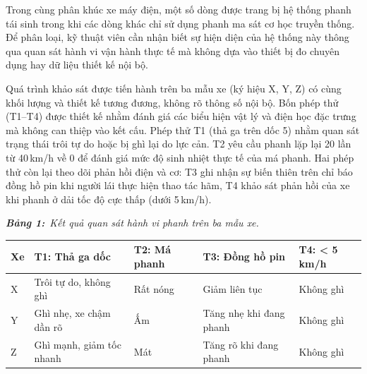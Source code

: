 \documentclass[12pt,a4paper,twoside]{article}
\newcommand{\tablecaption}[2]{%
    \par\vspace{2pt}%
    {\centering\textbf{\textit{Bảng #1:}}~\textit{#2}\par}%
    \vspace{0pt}%
}
\newenvironment{readingpassage}[1][]{%
    \begin{tcolorbox}[enhanced, colback=grayLight, colframe=secondaryBlue,
        coltitle=textDark, fonttitle=\bfseries, title={#1},
        rounded corners, arc=3mm, boxrule=1pt,
        left=15pt, right=15pt, top=10pt, bottom=10pt,
        breakable, before skip=10pt, after skip=10pt, drop fuzzy shadow]
    \setstretch{1.3}
}{\end{tcolorbox}}
\begin{document}
\begin{readingpassage}[]

Trong cùng phân khúc xe máy điện, một số dòng được trang bị hệ thống phanh tái sinh trong khi các dòng khác chỉ sử dụng phanh ma sát cơ học truyền thống. Để phân loại, kỹ thuật viên cần nhận biết sự hiện diện của hệ thống này thông qua quan sát hành vi vận hành thực tế mà không dựa vào thiết bị đo chuyên dụng hay dữ liệu thiết kế nội bộ.

Quá trình khảo sát được tiến hành trên ba mẫu xe (ký hiệu X, Y, Z) có cùng khối lượng và thiết kế tương đương, không rõ thông số nội bộ. Bốn phép thử (T1--T4) được thiết kế nhằm đánh giá các biểu hiện vật lý và điện học đặc trưng mà không can thiệp vào kết cấu. Phép thử T1 (thả ga trên dốc 5\textdegree{}) nhằm quan sát trạng thái trôi tự do hoặc bị ghì lại do lực cản. T2 yêu cầu phanh lặp lại 20 lần từ 40\,km/h về 0 để đánh giá mức độ sinh nhiệt thực tế của má phanh. Hai phép thử còn lại theo dõi phản hồi điện và cơ: T3 ghi nhận sự biến thiên trên chỉ báo đồng hồ pin khi người lái thực hiện thao tác hãm, T4 khảo sát phản hồi của xe khi phanh ở dải tốc độ cực thấp (dưới 5\,km/h).

\tablecaption{1}{Kết quả quan sát hành vi phanh trên ba mẫu xe.}
\vspace{2pt}
\renewcommand{\arraystretch}{1.35}
{\small
\begin{center}
\begin{tabular}{|>{\centering\arraybackslash}m{0.8cm}|>{\centering\arraybackslash}m{2.8cm}|>{\centering\arraybackslash}m{2.2cm}|>{\centering\arraybackslash}m{3cm}|>{\centering\arraybackslash}m{2.2cm}|}
\hline
\rowcolor{primaryBlue!12}
\textbf{Xe} & \textbf{T1: Thả ga dốc} & \textbf{T2: Má phanh} & \textbf{T3: Đồng hồ pin} & \textbf{T4: < 5 km/h} \\
\hline
X & Trôi tự do, không ghì & Rất nóng & Giảm liên tục & Không ghì \\
\hline
Y & Ghì nhẹ, xe chậm dần rõ & Ấm & Tăng nhẹ khi đang phanh & Không ghì \\
\hline
Z & Ghì mạnh, giảm tốc nhanh & Mát & Tăng rõ khi đang phanh & Không ghì \\
\hline
\end{tabular}
\end{center}
}


\end{readingpassage}
\end{document}
